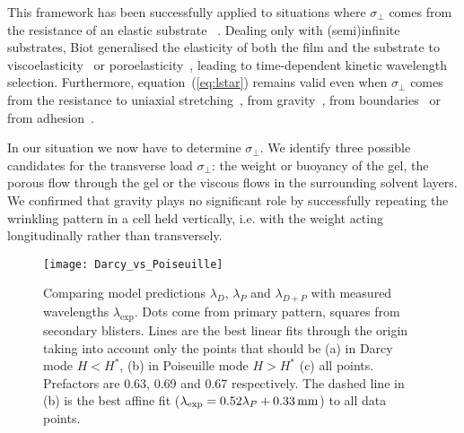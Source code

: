 \documentclass[twocolumn,superscriptaddress,showpacs,preprintnumbers,
amsmath,amssymb,prl]{revtex4-1}
\begin{document}
This framework has been successfully applied to situations where $\sigma_{\perp}$ comes from the resistance of an elastic substrate ~\cite{Gough1940, Bijlaard1946}. Dealing only with (semi)infinite substrates, Biot generalised the elasticity of both the film and the substrate to viscoelasticity~\cite{Biot1957} or poroelasticity~\cite{Biot1964}, leading to time-dependent kinetic wavelength selection. Furthermore, equation~(\ref{eq:lstar}) remains valid even when $\sigma_{\perp}$ comes from the resistance to uniaxial stretching~\cite{Cerda2003}, from gravity~\cite{Smoluchowski1910, Kolinski2009, Vella2009, Pineirua2013, Lucantonio2013}, from boundaries~\cite{Vandeparre2011a, Li2013} or from adhesion~\cite{Vella2009a}.

In our situation we now have to determine $\sigma_\perp$. We identify three possible candidates for the transverse load $\sigma_\perp$: the weight or buoyancy of the gel, the porous flow through the gel or the viscous flows in the surrounding solvent layers. We confirmed that gravity plays no significant role by successfully repeating the wrinkling pattern in a cell held vertically, i.e. with the weight acting longitudinally rather than transversely.


\begin{figure*}
	\texttt{[image: Darcy\_vs\_Poiseuille]}
	\caption{Comparing model predictions $\lambda_D$, $\lambda_P$ and $\lambda_{D+P}$ with measured wavelengths $\lambda_\text{exp}$. Dots come from primary pattern, squares from secondary blisters. Lines are the best linear fits through the origin taking into account only the points that should be (a) in Darcy mode $H<H^*$, (b) in Poiseuille mode $H>H^*$ (c) all points. Prefactors are 0.63, 0.69 and 0.67 respectively. The dashed line in (b) is the best affine fit ($\lambda_{\rm exp}=0.52\lambda_{P}+\SI{0.33}{\milli\metre}$) to all data points.}
	\label{fig:DarcyPoiseuille}
\end{figure*}
\end{document}
